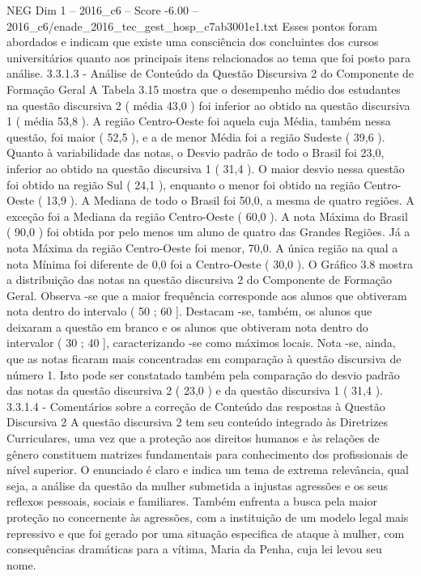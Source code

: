 \begin{textsample}{NEG Dim 1 – 2016\_c6 – Score -6.00 – 2016\_c6/enade\_2016\_tec\_gest\_hosp\_c7ab3001e1.txt}
Esses pontos foram abordados e indicam que existe uma consciência dos concluintes dos cursos universitários quanto aos principais itens relacionados ao tema que foi posto para análise. 3.3.1.3 - Análise de Conteúdo da Questão Discursiva 2 do Componente de Formação Geral A Tabela 3.15 mostra que o desempenho médio dos estudantes na questão discursiva 2 ( média 43,0 ) foi inferior ao obtido na questão discursiva 1 ( média 53,8 ).
A região Centro-Oeste foi aquela cuja Média, também nessa questão, foi maior ( 52,5 ), e a de menor Média foi a região Sudeste ( 39,6 ).
Quanto à variabilidade das notas, o Desvio padrão de todo o Brasil foi 23,0, inferior ao obtido na questão discursiva 1 ( 31,4 ).
O maior desvio nessa questão foi obtido na região Sul ( 24,1 ), enquanto o menor foi obtido na região Centro-Oeste ( 13,9 ).
A Mediana de todo o Brasil foi 50,0, a mesma de quatro regiões.
A exceção foi a Mediana da região Centro-Oeste ( 60,0 ).
A nota Máxima do Brasil ( 90,0 ) foi obtida por pelo menos um aluno de quatro das Grandes Regiões.
Já a nota Máxima da região Centro-Oeste foi menor, 70,0.
A única região na qual a nota Mínima foi diferente de 0,0 foi a Centro-Oeste ( 30,0 ).
O Gráfico 3.8 mostra a distribuição das notas na questão discursiva 2 do Componente de Formação Geral.
Observa -se que a maior frequência corresponde aos alunos que obtiveram nota dentro do intervalo ( 50 ; 60 ].
Destacam -se, também, os alunos que deixaram a questão em branco e os alunos que obtiveram nota dentro do intervalor ( 30 ; 40 ], caracterizando -se como máximos locais.
Nota -se, ainda, que as notas ficaram mais concentradas em comparação à questão discursiva de número 1.
Isto pode ser constatado também pela comparação do desvio padrão das notas da questão discursiva 2 ( 23,0 ) e da questão discursiva 1 ( 31,4 ). 3.3.1.4 - Comentários sobre a correção de Conteúdo das respostas à Questão Discursiva 2 A questão discursiva 2 tem seu conteúdo integrado às Diretrizes Curriculares, uma vez que a proteção aos direitos humanos e às relações de gênero constituem matrizes fundamentais para conhecimento dos profissionais de nível superior.
O enunciado é claro e indica um tema de extrema relevância, qual seja, a análise da questão da mulher submetida a injustas agressões e os seus reflexos pessoais, sociais e familiares.
Também enfrenta a busca pela maior proteção no concernente às agressões, com a instituição de um modelo legal mais repressivo e que foi gerado por uma situação especifica de ataque à mulher, com consequências dramáticas para a vítima, Maria da Penha, cuja lei levou seu nome.

\end{textsample}
